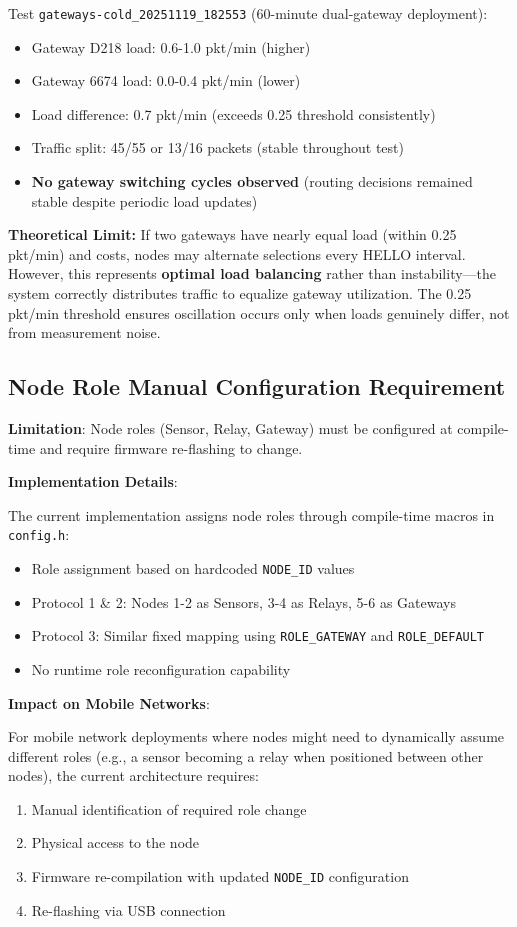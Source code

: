 Test \texttt{gateways-cold\_20251119\_182553} (60-minute dual-gateway deployment):
\begin{itemize}
\item Gateway D218 load: 0.6-1.0 pkt/min (higher)
\item Gateway 6674 load: 0.0-0.4 pkt/min (lower)
\item Load difference: 0.7 pkt/min (exceeds 0.25 threshold consistently)
\item Traffic split: 45/55 or 13/16 packets (stable throughout test)
\item \textbf{No gateway switching cycles observed} (routing decisions remained stable despite periodic load updates)
\end{itemize}

\textbf{Theoretical Limit:} If two gateways have nearly equal load (within 0.25 pkt/min) and costs, nodes may alternate selections every HELLO interval. However, this represents \textbf{optimal load balancing} rather than instability---the system correctly distributes traffic to equalize gateway utilization. The 0.25 pkt/min threshold ensures oscillation occurs only when loads genuinely differ, not from measurement noise.

\subsection{Node Role Manual Configuration Requirement}

\textbf{Limitation}: Node roles (Sensor, Relay, Gateway) must be configured at compile-time and require firmware re-flashing to change.

\textbf{Implementation Details}:

The current implementation assigns node roles through compile-time macros in \texttt{config.h}:

\begin{itemize}
\item Role assignment based on hardcoded \texttt{NODE\_ID} values
\item Protocol 1 \& 2: Nodes 1-2 as Sensors, 3-4 as Relays, 5-6 as Gateways
\item Protocol 3: Similar fixed mapping using \texttt{ROLE\_GATEWAY} and \texttt{ROLE\_DEFAULT}
\item No runtime role reconfiguration capability
\end{itemize}

\textbf{Impact on Mobile Networks}:

For mobile network deployments where nodes might need to dynamically assume different roles (e.g., a sensor becoming a relay when positioned between other nodes), the current architecture requires:
\begin{enumerate}
\item Manual identification of required role change
\item Physical access to the node
\item Firmware re-compilation with updated \texttt{NODE\_ID} configuration
\item Re-flashing via USB connection
\end{enumerate}

